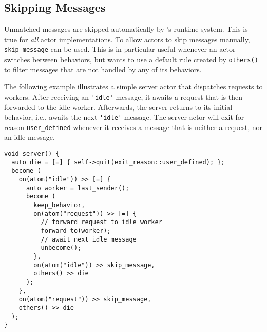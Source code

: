 \clearpage
\subsection{Skipping Messages}

Unmatched messages are skipped automatically by \libcppa's runtime system.
This is true for \textit{all} actor implementations.
To allow actors to skip messages manually, \lstinline^skip_message^ can be used.
This is in particular useful whenever an actor switches between behaviors, but wants to use a default rule created by \lstinline^others()^ to filter messages that are not handled by any of its behaviors.

The following example illustrates a simple server actor that dispatches requests to workers.
After receiving an \lstinline^'idle'^ message, it awaits a request that is then forwarded to the idle worker.
Afterwards, the server returns to its initial behavior, i.e., awaits the next \lstinline^'idle'^ message.
The server actor will exit for reason \lstinline^user_defined^ whenever it receives a message that is neither a request, nor an idle message.

\begin{lstlisting}
void server() {
  auto die = [=] { self->quit(exit_reason::user_defined); };
  become (
    on(atom("idle")) >> [=] {
      auto worker = last_sender();
      become (
        keep_behavior,
        on(atom("request")) >> [=] {
          // forward request to idle worker
          forward_to(worker);
          // await next idle message
          unbecome();
        },
        on(atom("idle")) >> skip_message,
        others() >> die
      );
    },
    on(atom("request")) >> skip_message,
    others() >> die
  );
}
\end{lstlisting}
